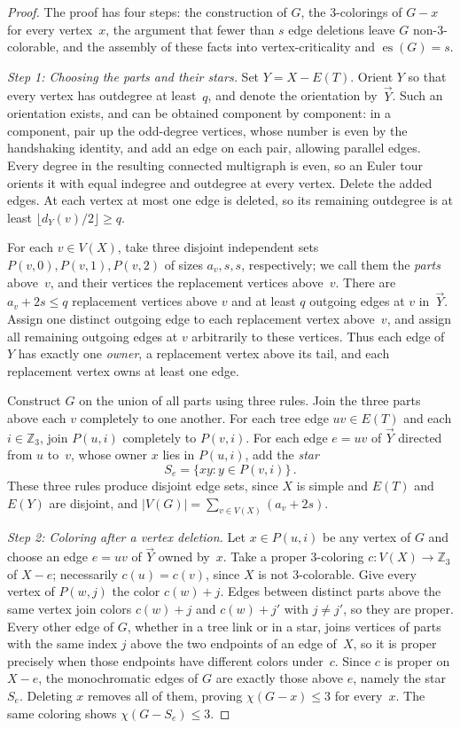 \documentclass[11pt,letterpaper]{article}
\numberwithin{equation}{section}
\theoremstyle{plain}
\theoremstyle{definition}
\theoremstyle{remark}
\DeclareMathOperator{\es}{es}
\newcommand{\Z}{\mathbb{Z}}
\begin{document}
\begin{proof}
The proof has four steps: the construction of $G$, the $3$-colorings of $G-x$ for every vertex~$x$, the argument that fewer than $s$ edge deletions leave $G$ non-$3$-colorable, and the assembly of these facts into vertex-criticality and $\es(G)=s$.

\emph{Step 1: Choosing the parts and their stars.}
Set $Y=X-E(T)$. Orient $Y$ so that every vertex has outdegree at least~$q$, and denote the orientation by~$\vec Y$. Such an orientation exists, and can be obtained component by component: in a component, pair up the odd-degree vertices, whose number is even by the handshaking identity, and add an edge on each pair, allowing parallel edges. Every degree in the resulting connected multigraph is even, so an Euler tour orients it with equal indegree and outdegree at every vertex. Delete the added edges. At each vertex at most one edge is deleted, so its remaining outdegree is at least $\lfloor d_Y(v)/2\rfloor\ge q$.

For each $v\in V(X)$, take three disjoint independent sets $P(v,0),P(v,1),P(v,2)$ of sizes $a_v,s,s$, respectively; we call them the \emph{parts} above~$v$, and their vertices the replacement vertices above~$v$. There are $a_v+2s\le q$ replacement vertices above $v$ and at least $q$ outgoing edges at $v$ in~$\vec Y$. Assign one distinct outgoing edge to each replacement vertex above~$v$, and assign all remaining outgoing edges at $v$ arbitrarily to these vertices. Thus each edge of $Y$ has exactly one \emph{owner}, a replacement vertex above its tail, and each replacement vertex owns at least one edge.

Construct $G$ on the union of all parts using three rules. Join the three parts above each $v$ completely to one another. For each tree edge $uv\in E(T)$ and each $i\in\Z_3$, join $P(u,i)$ completely to $P(v,i)$. For each edge $e=uv$ of $\vec Y$ directed from $u$ to~$v$, whose owner $x$ lies in $P(u,i)$, add the \emph{star}
\begin{equation*}
  S_e=\{xy: y\in P(v,i)\}\,.
\end{equation*}
These three rules produce disjoint edge sets, since $X$ is simple and $E(T)$ and $E(Y)$ are disjoint, and $|V(G)|=\sum_{v\in V(X)}(a_v+2s)$.

\emph{Step 2: Coloring after a vertex deletion.}
Let $x\in P(u,i)$ be any vertex of $G$ and choose an edge $e=uv$ of $\vec Y$ owned by~$x$. Take a proper $3$-coloring $c\colon V(X)\to\Z_3$ of $X-e$; necessarily $c(u)=c(v)$, since $X$ is not $3$-colorable. Give every vertex of $P(w,j)$ the color $c(w)+j$. Edges between distinct parts above the same vertex join colors $c(w)+j$ and $c(w)+j'$ with $j\ne j'$, so they are proper. Every other edge of $G$, whether in a tree link or in a star, joins vertices of parts with the same index $j$ above the two endpoints of an edge of~$X$, so it is proper precisely when those endpoints have different colors under~$c$. Since $c$ is proper on $X-e$, the monochromatic edges of $G$ are exactly those above $e$, namely the star~$S_e$. Deleting $x$ removes all of them, proving $\chi(G-x)\le 3$ for every~$x$. The same coloring shows $\chi(G-S_e)\le 3$.


\end{proof}
\end{document}
